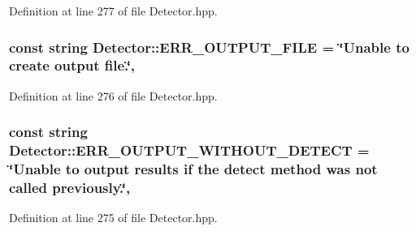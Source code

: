 Definition at line 277 of file Detector.\-hpp.

\hypertarget{classmultiscale_1_1analysis_1_1Detector_aab6b3a68e93cad9a93885e52f1c2ce04}{
\subsubsection[{E\-R\-R\-\_\-\-O\-U\-T\-P\-U\-T\-\_\-\-F\-I\-L\-E}]{\setlength{\rightskip}{0pt plus 5cm}const string Detector\-::\-E\-R\-R\-\_\-\-O\-U\-T\-P\-U\-T\-\_\-\-F\-I\-L\-E = \char`\"{}Unable to create output file.\char`\"{}\hspace{0.3cm}{\ttfamily [static]}, {\ttfamily [protected]}}}\label{classmultiscale_1_1analysis_1_1Detector_aab6b3a68e93cad9a93885e52f1c2ce04}


Definition at line 276 of file Detector.\-hpp.

\hypertarget{classmultiscale_1_1analysis_1_1Detector_a5837f0e4ffef6410774ff9bcda72238b}{
\subsubsection[{E\-R\-R\-\_\-\-O\-U\-T\-P\-U\-T\-\_\-\-W\-I\-T\-H\-O\-U\-T\-\_\-\-D\-E\-T\-E\-C\-T}]{\setlength{\rightskip}{0pt plus 5cm}const string Detector\-::\-E\-R\-R\-\_\-\-O\-U\-T\-P\-U\-T\-\_\-\-W\-I\-T\-H\-O\-U\-T\-\_\-\-D\-E\-T\-E\-C\-T = \char`\"{}Unable to output results if the {\bf detect} method was not called previously.\char`\"{}\hspace{0.3cm}{\ttfamily [static]}, {\ttfamily [protected]}}}\label{classmultiscale_1_1analysis_1_1Detector_a5837f0e4ffef6410774ff9bcda72238b}


Definition at line 275 of file Detector.\-hpp.

